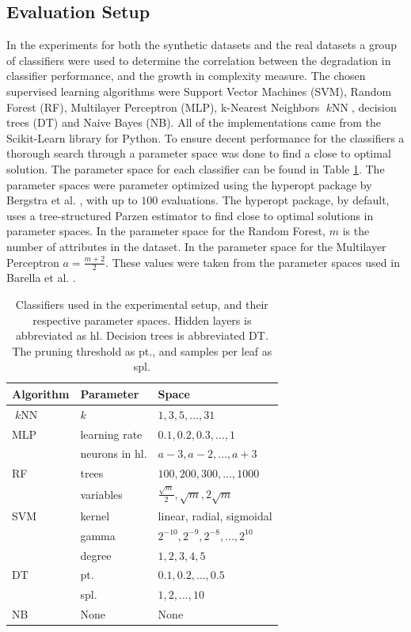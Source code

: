 \documentclass[twoside,leqno,twocolumn]{article}
\DeclareMathOperator{\knn}{\textit{k}\text{NN}}
\begin{document}
\subsection{Evaluation Setup} \label{sec:evaluation_setup}
In the experiments for both the synthetic datasets and the real datasets a group of classifiers were used to determine the correlation between the degradation in classifier performance, and the growth in complexity measure. The chosen supervised learning algorithms were Support Vector Machines (SVM), Random Forest (RF), Multilayer Perceptron (MLP), k-Nearest Neighbors $\knn$, decision trees (DT) and Naive Bayes (NB). All of the implementations came from the Scikit-Learn library for Python. To ensure decent performance for the classifiers a thorough search through a parameter space was done to find a close to optimal solution. The parameter space for each classifier can be found in Table \ref{tab:param_space}. The parameter spaces were parameter optimized using the hyperopt package by Bergstra et al. \cite{DBLP:conf/icml/BergstraYC13}, with up to $100$ evaluations. The hyperopt package, by default, uses a tree-structured Parzen estimator to find close to optimal solutions in parameter spaces. In the parameter space for the Random Forest, $m$ is the number of attributes in the dataset. In the parameter space for the Multilayer Perceptron $a=\frac{m+2}{2}$. These values were taken from the parameter spaces used in Barella et al. \cite{DBLP:journals/isci/BarellaGSLC21}.
\begin{table}[tbp]
    \centering
    \begin{tabular}{lll}
        \toprule
        Algorithm & Parameter & Space \\
        \midrule
        $\knn$ & $k$ & $1,3,5,\dots,31$ \\ 
        \midrule
        MLP & learning rate & $0.1,0.2,0.3,\dots,1$ \\
                            & neurons in hl. & $a-3,a-2,\dots,a+3$ \\
        \midrule
        RF & trees & $100,200,300,\dots,1000$ \\
           & variables & $\frac{\sqrt{m}}{2},\sqrt{m},2\sqrt{m}$ \\
        \midrule 
        SVM & kernel & linear, radial, sigmoidal \\
            & gamma & $2^{-10},2^{-9},2^{-8},\dots,2^{10}$ \\
            & degree & $1,2,3,4,5$ \\
            \midrule 
        DT & pt. & $0.1,0.2,\dots,0.5$\\
        & spl. & $1,2,\dots,10$ \\
        \midrule
        NB & None & None \\
        \bottomrule
    \end{tabular}
    \caption{\label{tab:param_space} Classifiers used in the experimental setup, and their respective parameter spaces. Hidden layers is abbreviated as hl. Decision trees is abbreviated DT. The pruning threshold as pt., and samples per leaf as spl.}
\end{table}
\end{document}
